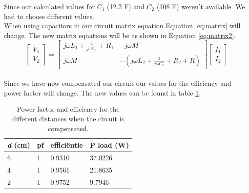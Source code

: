 \documentclass[final]{scrreprt} %
\begin{document}
Since our calculated values for $C_1$ (12.2 \nano F) and $C_2$ (108 \nano F) weren't available.
We had to choose different values. \\

When using capacitors in our circuit matrix equation Equation \ref{eq:matrix} will change. 
The new matrix equations will be as shown in Equation \ref{eq:matrix2}. \\

\begin{equation}
	\begin{bmatrix}
		V_1 \\
		V_2
	\end{bmatrix} =
	\begin{bmatrix}
		j\omega 
L_{1} + \frac{1}{j\omega C_{1}} + R_{1}& - j\omega M \\
		j\omega M& - (j\omega L_{2} + \frac{1}{j\omega C_{2}} + R_{2} + R)
	\end{bmatrix}
	\begin{bmatrix}
		I_1 \\
		I_2
	\end{bmatrix}
	\label{eq:matrix2}
\end{equation}\\




Since we have now compensated our circuit our values for the efficiency and power factor will change. 
The new values can be found in table \ref{table3}. \\

\begin{table}[h]
\begin{center}
\begin{tabular}{ l | l | l | l }
    
    \textbf{\textit{d} (cm)}            & \textbf{pf}              & \textbf{effici\"{e}ntie}  &  \textbf{P load (W)}\\	\hline
    6                           & 1                     & 0.9310                & 37.0226  \\
    4                           &1                  & 0.9561                     & 21.8635\\
    2                           & 1                   & 0.9752                    &  9.7946 \\
\end{tabular}
\caption{Power factor and efficiency for the different distances when the circuit is compensated.}
\label{table3}
\end{center}
\end{table}
\end{document}
